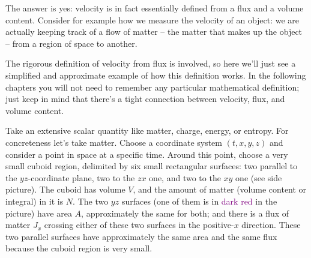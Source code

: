 \documentclass[a4paper,12pt,%
onecolumn,oneside,%
british%
]{memoir}
\renewcommand*{\|}[1][]{\nonscript\:#1\vert\nonscript\:\mathopen{}}
\newcommand*{\yN}{N}
\newcommand*{\yJ}{J}
\begin{document}
The answer is yes: velocity is in fact essentially defined from a flux and a volume content. Consider for example how we measure the velocity of an object: we are actually keeping track of a flow of matter -- the matter that makes up the object -- from a region of space to another.

The rigorous definition of velocity from flux is involved, so here we'll just see a simplified and approximate example of how this definition works. In the following chapters you will not need to remember any particular mathematical definition; just keep in mind that there's a tight connection between velocity, flux, and volume content.

Take an extensive scalar quantity like matter, charge, energy, or entropy. For concreteness let's take matter. Choose a coordinate system $(t,x,y,z)$ and consider a point in space at a specific time.
%
%
Around this point, choose a very small cuboid region, delimited by six small rectangular surfaces: two parallel to the $yz$-coordinate plane, two to the $zx$ one, and two to the $xy$ one (see side picture). The cuboid has volume $V$, and the amount of matter (volume content or integral) in it is $\yN$. The two $yz$ surfaces (one of them is in \textcolor{purple}{dark red} in the picture) have area $A$, approximately the same for both; and there is a flux of matter $\yJ_{x}$ crossing either of these two surfaces in the positive-$x$ direction. These two parallel surfaces have approximately the same area and the same flux because the cuboid region is very small.
\end{document}
